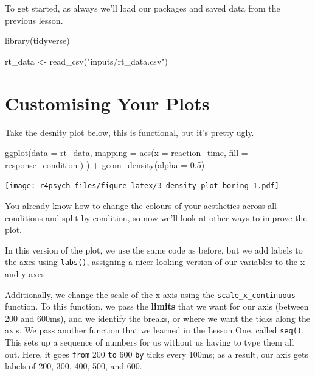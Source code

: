 \documentclass[
]{book}
\newenvironment{Shaded}{\begin{snugshade}}{\end{snugshade}}
\newcommand{\AttributeTok}[1]{\textcolor[rgb]{0.77,0.63,0.00}{#1}}
\newcommand{\FloatTok}[1]{\textcolor[rgb]{0.00,0.00,0.81}{#1}}
\newcommand{\FunctionTok}[1]{\textcolor[rgb]{0.00,0.00,0.00}{#1}}
\newcommand{\NormalTok}[1]{#1}
\newcommand{\OtherTok}[1]{\textcolor[rgb]{0.56,0.35,0.01}{#1}}
\newcommand{\SpecialCharTok}[1]{\textcolor[rgb]{0.00,0.00,0.00}{#1}}
\newcommand{\StringTok}[1]{\textcolor[rgb]{0.31,0.60,0.02}{#1}}
\begin{document}
To get started, as always we'll load our packages and saved data from the previous lesson.

\begin{Shaded}
\begin{Highlighting}[]
\FunctionTok{library}\NormalTok{(tidyverse)}
\end{Highlighting}
\end{Shaded}

\begin{Shaded}
\begin{Highlighting}[]
\NormalTok{rt\_data }\OtherTok{\textless{}{-}} \FunctionTok{read\_csv}\NormalTok{(}\StringTok{"inputs/rt\_data.csv"}\NormalTok{)}
\end{Highlighting}
\end{Shaded}

\hypertarget{customising-your-plots}{%
\section{Customising Your Plots}\label{customising-your-plots}}

Take the desnity plot below, this is functional, but it's pretty ugly.

\begin{Shaded}
\begin{Highlighting}[]
\FunctionTok{ggplot}\NormalTok{(}\AttributeTok{data =}\NormalTok{ rt\_data, }
       \AttributeTok{mapping =} \FunctionTok{aes}\NormalTok{(}\AttributeTok{x =}\NormalTok{ reaction\_time, }
                     \AttributeTok{fill =}\NormalTok{ response\_condition}
\NormalTok{                     )}
\NormalTok{       ) }\SpecialCharTok{+}
  \FunctionTok{geom\_density}\NormalTok{(}\AttributeTok{alpha =} \FloatTok{0.5}\NormalTok{)}
\end{Highlighting}
\end{Shaded}

\texttt{[image: r4psych\_files/figure-latex/3\_density\_plot\_boring-1.pdf]}

You already know how to change the colours of your aesthetics across all conditions and split by condition, so now we'll look at other ways to improve the plot.

In this version of the plot, we use the same code as before, but we add labels to the axes using \texttt{labs()}, assigning a nicer looking version of our variables to the x and y axes.

Additionally, we change the scale of the x-axis using the \texttt{scale\_x\_continuous} function. To this function, we pass the \textbf{limits} that we want for our axis (between 200 and 600ms), and we identify the breaks, or where we want the ticks along the axis. We pass another function that we learned in the Lesson One, called \texttt{seq()}. This sets up a sequence of numbers for us without us having to type them all out. Here, it goes \texttt{from} 200 \texttt{to} 600 \texttt{by} ticks every 100ms; as a result, our axis gets labels of 200, 300, 400, 500, and 600.
\end{document}
